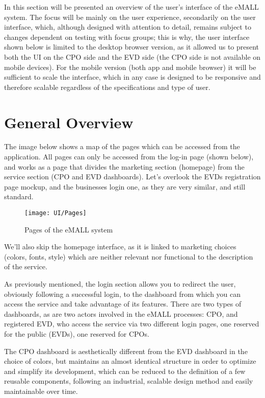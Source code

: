 In this section will be presented an overview of the user’s interface of the eMALL system. The focus will be mainly on the user experience, secondarily on the user interface, which, although designed with attention to detail, remains subject to changes dependent on testing with focus groups; this is why, the user interface shown below is limited to the desktop browser version, as it allowed us to present both the UI on the CPO side and the EVD side (the CPO side is not available on mobile devices). For the mobile version (both app and mobile browser) it will be sufficient to scale the interface, which in any case is designed to be responsive and therefore scalable regardless of the specifications and type of user.

\section{General Overview}
\label{sec: general_overview}%
The image below shows a map of the pages which can be accessed from the application. All pages can only be accessed from the log-in page (shown below), and works as a page that divides the marketing section (homepage) from the service section (CPO and EVD dashboards). Let's overlook the EVDs registration page mockup, and the businesses login one, as they are very similar, and still standard.

\begin{figure} [H]
	\begin{center}
		\texttt{[image: UI/Pages]}
		\caption{Pages of the eMALL system}
		\label{fig: cd}
	\end{center}
\end{figure}

We’ll also skip the homepage interface, as it is linked to marketing choices (colors, fonts, style) which are neither relevant nor functional to the description of the service.

As previously mentioned, the login section allows you to redirect the user, obviously following a successful login, to the dashboard from which you can access the service and take advantage of its features. There are two types of dashboards, as are two actors involved in the eMALL processes: CPO, and registered EVD, who access the service via two different login pages, one reserved for the public (EVDs), one reserved for CPOs. 

The CPO dashboard is aesthetically different from the EVD dashboard in the choice of colors, but maintains an almost identical structure in order to optimize and simplify its development, which can be reduced to the definition of a few reusable components, following an industrial, scalable design method and easily maintainable over time.

